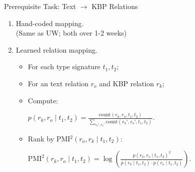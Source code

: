 \def\title{Prerequisite Task: Text $\rightarrow$ KBP Relations}
\begin{frame}{\title}
\begin{enumerate}
  \item Hand-coded mapping. \\
        (Same as UW; both over 1-2 weeks)
        \pause
        \vspace{1em}

  \item Learned relation mapping.
  \begin{itemize}
    \item For each type signature $t_1, t_2$;
    \item For an text relation $r_o$ and KBP relation $r_k$;
    \pause
    \item Compute:
      \begin{center}
        $
        p(r_k, r_o \mid t_1, t_2) = \frac{
          \textrm{count}(r_k, r_o,  t_1, t_2)
        }{
          \sum_{r_k', r_o'}\textrm{count}(r_k', r_o', t_1, t_2)
        }
        $.
      \end{center}
    \pause
    \item Rank by PMI$^2(r_o, r_k \mid t_1, t_2)$:
      \begin{center}
        $
        \textrm{PMI}^2(r_k, r_o \mid t_1, t_2) = \log \left( \frac{p(r_k, r_o \mid t_1, t_2)^2}{p(r_k \mid t_1, t_2) \cdot p(r_o \mid t_1, t_2)} \right)
        $.
      \end{center}
  \end{itemize}
\end{enumerate}
\end{frame}


